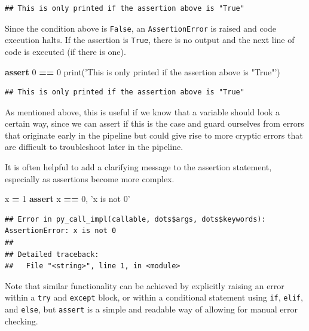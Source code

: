 \documentclass[]{Nemilov}
\newenvironment{Shaded}{\begin{snugshade}}{\end{snugshade}}
\newcommand{\BuiltInTok}[1]{#1}
\newcommand{\ControlFlowTok}[1]{\textcolor[rgb]{0.13,0.29,0.53}{\textbf{#1}}}
\newcommand{\DecValTok}[1]{\textcolor[rgb]{0.00,0.00,0.81}{#1}}
\newcommand{\NormalTok}[1]{#1}
\newcommand{\OperatorTok}[1]{\textcolor[rgb]{0.81,0.36,0.00}{\textbf{#1}}}
\newcommand{\StringTok}[1]{\textcolor[rgb]{0.31,0.60,0.02}{#1}}
\begin{document}
\begin{verbatim}
## This is only printed if the assertion above is "True"
\end{verbatim}

Since the condition above is \texttt{False}, an \texttt{AssertionError} is raised and code
execution halts. If the assertion is \texttt{True}, there is no output and the next
line of code is executed (if there is one).

\begin{Shaded}
\begin{Highlighting}[]
\ControlFlowTok{assert} \DecValTok{0} \OperatorTok{==} \DecValTok{0}
\BuiltInTok{print}\NormalTok{(}\StringTok{'This is only printed if the assertion above is "True"'}\NormalTok{)}
\end{Highlighting}
\end{Shaded}

\begin{verbatim}
## This is only printed if the assertion above is "True"
\end{verbatim}

As mentioned above, this is useful if we know that a variable should look a
certain way, since we can assert if this is the case and guard ourselves from
errors that originate early in the pipeline but could give rise to more cryptic
errors that are difficult to troubleshoot later in the pipeline.

It is often helpful to add a clarifying message to the assertion statement,
especially as assertions become more complex.

\begin{Shaded}
\begin{Highlighting}[]
\NormalTok{x }\OperatorTok{=} \DecValTok{1}
\ControlFlowTok{assert}\NormalTok{ x }\OperatorTok{==} \DecValTok{0}\NormalTok{, }\StringTok{'x is not 0'}
\end{Highlighting}
\end{Shaded}

\begin{verbatim}
## Error in py_call_impl(callable, dots$args, dots$keywords): AssertionError: x is not 0
## 
## Detailed traceback: 
##   File "<string>", line 1, in <module>
\end{verbatim}

Note that similar functionality can be achieved by explicitly raising an error
within a \texttt{try} and \texttt{except} block, or within a conditional statement using
\texttt{if}, \texttt{elif}, and \texttt{else}, but \texttt{assert} is a simple and readable way of allowing
for manual error checking.
\end{document}
